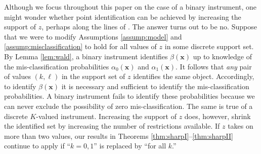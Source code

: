 Although we focus throughout this paper on the case of a binary instrument, one might wonder whether point identification can be achieved by increasing the support of $z$, perhaps along the lines of \cite{Lewbel}.
The answer turns out to be no.
Suppose that we were to modify Assumptions \ref{assump:model} and \ref{assump:misclassification} to hold for all values of $z$ in some discrete support set.
By Lemma \ref{lem:wald}, a binary instrument identifies $\beta(\mathbf{x})$ up to knowledge of the mis-classification probabilities $\alpha_0(\mathbf{x})$ and $\alpha_1(\mathbf{x})$.
It follows that \emph{any} pair of values $(k,\ell)$ in the support set of $z$ identifies the same object.
Accordingly, to identify $\beta(\mathbf{x})$ it is necessary and sufficient to identify the mis-classification probabilities.
A binary instrument fails to identify these probabilities because we can never exclude the possibility of zero mis-classification.
The same is true of a discrete $K$-valued instrument. 
Increasing the support of $z$ does, however, shrink the identified set by increasing the number of restrictions available.
If $z$ takes on more than two values, our results in Theorems \ref{thm:sharpI}--\ref{thm:sharpII} continue to apply if ``$k=0,1$'' is replaced by ``for all $k$.''





